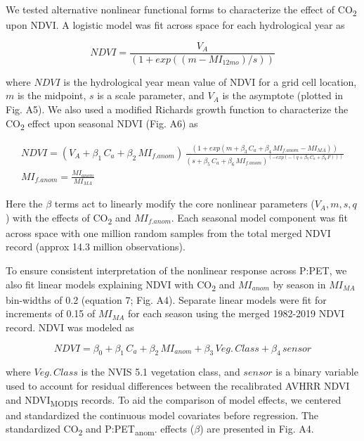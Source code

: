 \documentclass[gc, manuscript]{copernicus}
\begin{document}
We tested alternative nonlinear functional forms to characterize the
effect of CO\textsubscript{2} upon NDVI. A logistic model was fit across
space for each hydrological year as

\begin{equation}
NDVI = \frac{V_A}{(1+exp((m-MI_{12mo})/s))}
\end{equation}

where \(NDVI\) is the hydrological year mean value of NDVI for a grid
cell location, \(m\) is the midpoint, \(s\) is a scale parameter, and
\(V_A\) is the asymptote (plotted in Fig. A5). We also used a modified
Richards growth function to characterize the CO\textsubscript{2} effect
upon seasonal NDVI (Fig. A6) as

\begin{align}
NDVI=(V_A+\beta_1\,C_{a}+\beta_2\,MI_{f.anom})\,\frac{(1+exp(m+\beta_3\,C_{a}+\beta_4\,MI_{f.anom} - MI_{MA}))}{(s+\beta_5\,C_{a}+\beta_6\,MI_{f.anom})^{(-exp(-(q+\beta_7\,C_{a}+\beta_8\,F)))}}\\
MI_{f.anom} = \frac{MI_{anom}}{MI_{MA}}\nonumber
\end{align}

Here the \(\beta\) terms act to linearly modify the core nonlinear
parameters (\(V_A, m, s, q\)) with the effects of CO\textsubscript{2}
and \(MI_{f.anom}\). Each seasonal model component was fit across space
with one million random samples from the total merged NDVI record
(approx 14.3 million observations).

To ensure consistent interpretation of the nonlinear response across
P:PET, we also fit linear models explaining NDVI with
CO\textsubscript{2} and \(MI_{anom}\) by season in \(MI_{MA}\)
bin-widths of 0.2 (equation 7; Fig. A4). Separate linear models were fit
for increments of 0.15 of \(MI_{MA}\) for each season using the merged
1982-2019 NDVI record. NDVI was modeled as

\begin{equation}
NDVI = \beta_0+\beta_1\,C_{a} + \beta_2\,MI_{anom}+\beta_3\,Veg.\,Class+\beta_4\,sensor
\end{equation}

where \(Veg.\,Class\) is the NVIS 5.1 vegetation class, and \(sensor\)
is a binary variable used to account for residual differences between
the recalibrated AVHRR NDVI and NDVI\textsubscript{MODIS} records. To
aid the comparison of model effects, we centered and standardized the
continuous model covariates before regression. The standardized
CO\textsubscript{2} and P:PET\textsubscript{anom}. effects (\(\beta\))
are presented in Fig. A4.
\end{document}
